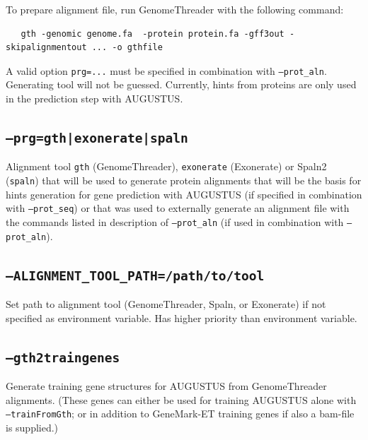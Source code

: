 \documentclass[a4paper,10pt]{report}
\begin{document}
                                         To prepare alignment file, run GenomeThreader with the following command:
                                         
                                         \begin{verbatim}
   gth -genomic genome.fa  -protein protein.fa -gff3out -skipalignmentout ... -o gthfile
                                         \end{verbatim}
                                         
                                         A valid option \texttt{prg=...} must be specified in combination with 
                                         \texttt{--prot\_aln}. Generating tool will not be guessed.
                                         Currently, hints from proteins are only used in the prediction step with
                                         AUGUSTUS.
    \subsection{\texttt{--prg=gth|exonerate|spaln}}            Alignment tool \texttt{gth} (GenomeThreader), \texttt{exonerate} (Exonerate) or Spaln2
                                         (\texttt{spaln}) that will be used to generate protein alignments that will be the 
                                         basis for hints generation for gene prediction with AUGUSTUS (if specified
                                         in combination with \texttt{--prot\_seq}) or that was used to externally
                                         generate an alignment file with the commands listed in description of 
                                         \texttt{--prot\_aln} (if used in combination with \texttt{--prot\_aln}).
    \subsection{\texttt{--ALIGNMENT\_TOOL\_PATH=/path/to/tool}}  Set path to alignment tool (GenomeThreader, Spaln, or Exonerate) if not 
                                         specified as environment variable. Has higher priority than environment
                                         variable.
    \subsection{\texttt{--gth2traingenes}}                     Generate training gene structures for AUGUSTUS from GenomeThreader
                                         alignments. (These genes can either be used for training AUGUSTUS
					 alone with \texttt{--trainFromGth}; or in addition to GeneMark-ET training genes if 
					 also a bam-file is supplied.)
\end{document}
